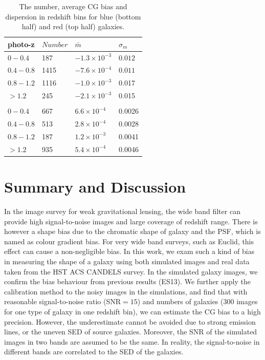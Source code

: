 \documentclass[useAMS,usenatbib]{mn2e}
\newcommand{\be}{\begin{equation}}
\newcommand{\ee}{\end{equation}}
\begin{document}
\begin{center}
\begin{table}
  \begin{tabular}{llll}
    \hline
    photo-z    &$Number$  &$\bar{m}$  &$\sigma_m$ \\
    \hline
    $0-0.4$   &187  &$-1.3\times10^{-3}$  &$0.012$\\
    $0.4-0.8$  &1415 &$-7.6\times10^{-4}$  &$0.011$\\
    $0.8-1.2$  &1116 &$-1.0\times10^{-3}$  &0.017\\
    $>1.2$  &245  &$-2.1\times10^{-3}$  &0.015\\
    \\
    $0-0.4$  &667  &$6.6\times10^{-4}$  &0.0026\\
    $0.4-0.8$ &513  &$2.8\times10^{-4}$  &0.0028\\
    $0.8-1.2$ &187  &$1.2\times10^{-3}$  &0.0041\\
    $>1.2$  &935  &$5.4\times10^{-4}$  &0.0046\\
    \hline
  \end{tabular}
  \caption{\label{table:calibration}The number, average CG bias and dispersion in redshift bins for blue (bottom half) and red (top half) galaxies. }
\end{table}
\end{center}



\section{Summary and Discussion}
In the image survey for weak gravitational lensing, the wide band
filter can provide high signal-to-noise images and large coverage of
redshift range. There is however a shape bias due to the chromatic
shape of galaxy and the PSF, which is named as colour gradient
bias. For very wide band surveys, such as Euclid, this effect can
cause a non-negligible bias.
%
In this work, we exam such a kind of bias in measuring the shape of
a galaxy using both simulated images and real data taken from the HST ACS
CANDELS survey.  In the simulated galaxy images, we confirm the bias
behaviour from previous results (ES13). We further apply the calibration
method to the noisy images in the simulations, and find that with
reasonable signal-to-noise ratio (SNR$=15$) and numbers of galaxies ($300$
images for one type of galaxy in one redshift bin), we can estimate
the CG bias to a high precision. However, the underestimate cannot
be avoided due to strong emission lines, or the uneven SED of source
galaxies. Moreover, the SNR of the simulated images in two
bands are assumed to be the same. In reality, the signal-to-noise in
different bands are correlated to the SED of the galaxies.
\end{document}
